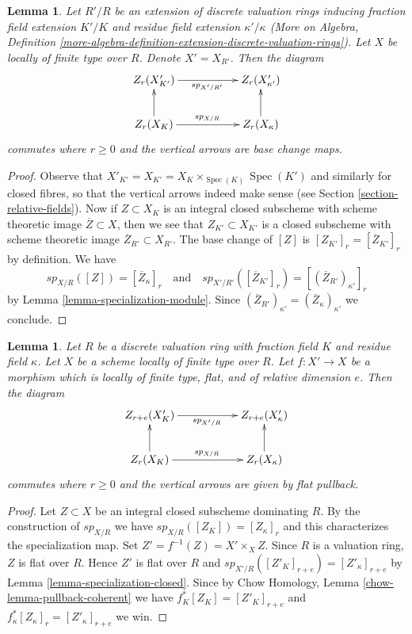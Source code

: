 \documentclass{stacks-project}
\theoremstyle{plain}
\newtheorem{lemma}[subsection]{Lemma}
\theoremstyle{definition}
\theoremstyle{remark}
\numberwithin{equation}{subsection}
\def\Spec{\mathop{\mathrm{Spec}}}
\begin{document}
\begin{lemma}
\label{lemma-specialization-extension}
Let $R'/R$ be an extension of discrete valuation rings inducing fraction field
extension $K'/K$ and residue field extension $\kappa'/\kappa$
(More on Algebra, Definition
\ref{more-algebra-definition-extension-discrete-valuation-rings}).
Let $X$ be locally of finite type over $R$. Denote $X' = X_{R'}$.
Then the diagram
$$
\xymatrix{
Z_r(X'_{K'}) \ar[rr]_{sp_{X'/R'}} & & Z_r(X'_{\kappa'}) \\
Z_r(X_K) \ar[rr]^{sp_{X/R}} \ar[u] & & Z_r(X_\kappa) \ar[u]
}
$$
commutes where $r \geq 0$ and the vertical arrows are base change maps.
\end{lemma}

\begin{proof}
Observe that $X'_{K'} = X_{K'} = X_K \times_{\Spec(K)} \Spec(K')$
and similarly for closed fibres, so that the vertical arrows indeed
make sense (see Section \ref{section-relative-fields}).
Now if $Z \subset X_K$ is an integral closed subscheme with
scheme theoretic image $\overline{Z} \subset X$, then we see that
$Z_{K'} \subset X_{K'}$ is a closed subscheme with scheme theoretic
image $\overline{Z}_{R'} \subset X_{R'}$. The base change of
$[Z]$ is $[Z_{K'}]_r = [\overline{Z}_{K'}]_r$ by definition. We have
$$
sp_{X/R}([Z]) = [\overline{Z}_\kappa]_r
\quad\text{and}\quad
sp_{X'/R'}([\overline{Z}_{K'}]_r) = [(\overline{Z}_{R'})_{\kappa'}]_r
$$
by Lemma \ref{lemma-specialization-module}. Since
$(\overline{Z}_{R'})_{\kappa'} = (\overline{Z}_\kappa)_{\kappa'}$
we conclude.
\end{proof}

\begin{lemma}
\label{lemma-specialization-flat-pullback}
Let $R$ be a discrete valuation ring with fraction field $K$ and residue field
$\kappa$. Let $X$ be a scheme locally of finite type over $R$.
Let $f : X' \to X$ be a morphism which is locally of finite type, flat,
and of relative dimension $e$. Then the diagram
$$
\xymatrix{
Z_{r + e}(X'_K) \ar[rr]_{sp_{X'/R}} & & Z_{r + e}(X'_\kappa) \\
Z_r(X_K) \ar[rr]^{sp_{X/R}} \ar[u] & & Z_r(X_\kappa) \ar[u]
}
$$
commutes where $r \geq 0$ and the vertical arrows are given
by flat pullback.
\end{lemma}

\begin{proof}
Let $Z \subset X$ be an integral closed subscheme dominating $R$.
By the construction of $sp_{X/R}$ we have $sp_{X/R}([Z_K]) = [Z_\kappa]_r$
and this characterizes the specialization map.
Set $Z' = f^{-1}(Z) = X' \times_X Z$.
Since $R$ is a valuation ring, $Z$ is flat over $R$.
Hence $Z'$ is flat over $R$ and
$sp_{X'/R}([Z'_K]_{r + e}) = [Z'_\kappa]_{r + e}$
by Lemma \ref{lemma-specialization-closed}.
Since by Chow Homology, Lemma \ref{chow-lemma-pullback-coherent}
we have $f_K^*[Z_K] = [Z'_K]_{r + e}$ and
$f_\kappa^*[Z_\kappa]_r = [Z'_\kappa]_{r + e}$ we win.
\end{proof}
\end{document}
